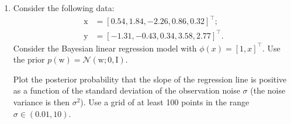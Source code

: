 \documentclass{article}
\newcommand{\mc}[1]{\mathcal{#1}}
\newcommand{\trans}{^\top}
\newcommand{\mat}[1]{\bm{\mathrm{#1}}}
\renewcommand{\vec}[1]{\bm{\mathrm{#1}}}
\begin{document}
\begin{enumerate}
\item
  Consider the following data:
  \begin{align*}
    \vec{x} &= [0.54, 1.84, -2.26, 0.86, 0.32]\trans; \\
    \vec{y} &= [-1.31, -0.43, 0.34, 3.58, 2.77]\trans.
  \end{align*}
  Consider the Bayesian linear regression model with $\phi(x) = [1,
    x]\trans$.  Use the prior $p(\vec{w}) = \mc{N}(\vec{w}; \vec{0},
  \mat{I})$.

  Plot the posterior probability that the slope of the regression line
  is positive as a function of the standard deviation of the
  observation noise $\sigma$ (the noise variance is then $\sigma^2$).
  Use a grid of at least 100 points in the range $\sigma \in (0.01,
  10)$.

\end{enumerate}
\end{document}
